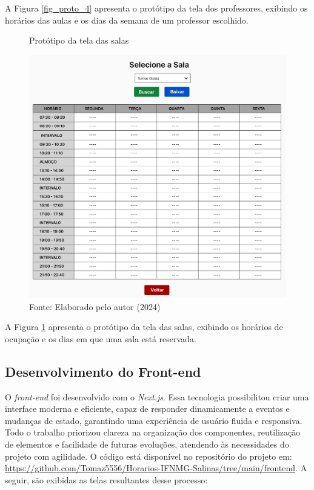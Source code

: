 A Figura \ref{fig_proto_4} apresenta o protótipo da tela dos professores, exibindo os horários das aulas e os dias da semana de um professor escolhido.

\begin{figure}[H]
    \centering
    \caption{Protótipo da tela das salas}
    \includegraphics[width=1\textwidth]{Figuras/proto-5.PNG}
    \caption*{Fonte: Elaborado pelo autor (2024)}
    \label{fig_proto_5}
\end{figure}

A Figura \ref{fig_proto_5} apresenta o protótipo da tela das salas, exibindo os horários de ocupação e os dias em que uma sala está reservada.

\subsection{Desenvolvimento do Front-end}

O \textit{front-end} foi desenvolvido com o \textit{Next.js}. Essa tecnologia possibilitou criar uma interface moderna e eficiente, capaz de responder dinamicamente a eventos e mudanças de estado, garantindo uma experiência de usuário fluida e responsiva. Todo o trabalho priorizou clareza na organização dos componentes, reutilização de elementos e facilidade de futuras evoluções, atendendo às necessidades do projeto com agilidade. O código está disponível no repositório do projeto em: \url{https://github.com/Tomaz5556/Horarios-IFNMG-Salinas/tree/main/frontend}. A seguir, são exibidas as telas resultantes desse processo:

